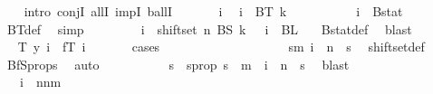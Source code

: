 \begin{isabellebody}
\ \ \ \isamarkupfalse%
{\isacharparenleft}{\kern0pt}intro\ conjI\ allI\ impI\ ballI{\isacharparenright}{\kern0pt}\isanewline
\ \ \ \ \ \isamarkupfalse%
\ i\ \isamarkupfalse%
\ {\isachardoublequoteopen}i\ {\isasymin}\ BT\ {\isacharparenleft}{\kern0pt}k\ {\isacharplus}{\kern0pt}\ {}{\isacharparenright}{\kern0pt}{\isachardoublequoteclose}\isanewline
\ \ \ \ \ \isamarkupfalse%
\ \isamarkupfalse%
\ {\isachardoublequoteopen}i\ {\isasymin}\ Bstat{\isachardoublequoteclose}\ \isamarkupfalse%
\ BT{\isacharunderscore}{\kern0pt}def\ \isamarkupfalse%
\ simp\isanewline
\ \ \ \ \ \isamarkupfalse%
\ \isamarkupfalse%
\ {\isachardoublequoteopen}i\ {\isasymin}\ shiftset\ n\ {\isacharparenleft}{\kern0pt}BS\ k{\isacharparenright}{\kern0pt}{\isachardoublequoteclose}\ {\isacharbar}{\kern0pt}\ \ {\isachardoublequoteopen}i\ {\isasymin}\ BL\ {}{\isachardoublequoteclose}\ \isamarkupfalse%
\ Bstat{\isacharunderscore}{\kern0pt}def\ \isamarkupfalse%
\ blast\isanewline
\ \ \ \ \ \isamarkupfalse%
\ \isamarkupfalse%
\ {\isachardoublequoteopen}T\ y\ i\ {\isacharequal}{\kern0pt}\ fT\ i{\isachardoublequoteclose}\isanewline
\ \ \ \ \ \isamarkupfalse%
\ {\isacharparenleft}{\kern0pt}cases{\isacharparenright}{\kern0pt}\isanewline
\ \ \ \ \ \ \ \isamarkupfalse%
\ {}\isanewline
\ \ \ \ \ \ \ \isamarkupfalse%
\ \isamarkupfalse%
\ {\isachardoublequoteopen}{\isasymexists}s{\isacharless}{\kern0pt}m{\isachardot}{\kern0pt}\ i\ {\isacharequal}{\kern0pt}\ n\ {\isacharplus}{\kern0pt}\ s{\isachardoublequoteclose}\ \isamarkupfalse%
\ shiftset{\isacharunderscore}{\kern0pt}def\ \isamarkupfalse%
\ BfS{\isacharunderscore}{\kern0pt}props{\isacharparenleft}{\kern0pt}{}{\isacharparenright}{\kern0pt}\ \isamarkupfalse%
\ auto\isanewline
\ \ \ \ \ \ \ \isamarkupfalse%
\ \isamarkupfalse%
\ s\ \ s{\isacharunderscore}{\kern0pt}prop{\isacharcolon}{\kern0pt}\ {\isachardoublequoteopen}s\ {\isacharless}{\kern0pt}\ m\ {\isasymand}\ i\ {\isacharequal}{\kern0pt}\ n\ {\isacharplus}{\kern0pt}\ s{\isachardoublequoteclose}\ \isamarkupfalse%
\ blast\isanewline
\ \ \ \ \ \ \ \isamarkupfalse%
\ \isamarkupfalse%
\ {\isacharasterisk}{\kern0pt}{\isacharcolon}{\kern0pt}\ {\isachardoublequoteopen}\ i\ {\isasymin}\ {\isacharbraceleft}{\kern0pt}n{\isachardot}{\kern0pt}{\isachardot}{\kern0pt}{\isacharless}{\kern0pt}n{\isacharplus}{\kern0pt}m{\isacharbraceright}{\kern0pt}{\isachardoublequoteclose}\ \isamarkupfalse%

\end{isabellebody}
